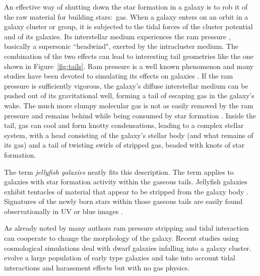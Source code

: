 An effective way of shutting down the star formation in a galaxy is to rob it of the raw material for building stars:~gas.
When a galaxy enters on an orbit in a galaxy cluster or group, it is subjected to the tidal forces of the cluster potential and of its galaxies.
Its interstellar medium experiences the ram pressure \citep{GunnGott1972}, basically a supersonic ``headwind", exerted by the intracluster medium.
The combination of the two effects can lead to interesting tail geometries like the one shown in Figure~\ref{fig:tails}.
Ram pressure is a well known phenomenon and many studies have been devoted to simulating its effects on galaxies \citep[e.g.:][]{Mori2000, Mayer2006, Roediger2008, Roediger2015, Steinhauser2016, Yun2018, Steyrleithner2020}.
If the ram pressure is sufficiently vigorous, the galaxy's diffuse interstellar medium can be pushed out of its gravitational well, forming a tail of escaping \Hi{} gas in the galaxy's wake.
The much more clumpy molecular gas is not as easily removed by the ram pressure and remains behind while being consumed by star formation \citep{Abramson2014, Lee2017, Wang2020}.
Inside the tail, gas can cool and form knotty condensations, leading to a complex stellar system, with a head consisting of the galaxy's stellar body (and what remains of its gas) and a tail of twisting swirls of stripped gas, beaded with knots of star formation.

The term \emph{jellyfish galaxies} \citep{Ebeling2013} neatly fits this description. %
The term applies to galaxies with star formation activity within the gaseous tails.
Jellyfish galaxies exhibit tentacles of material that appear to be stripped from the galaxy body \citep{Poggianti2017a, Poggianti2019b, Ramatsoku2020}.
Signatures of the newly born stars within those gaseous tails are easily found observationally in UV or blue images \citep{Cortese2007,Smith2010a}.
\bigskip

As already noted by many authors \citep{Mayer2001, Mayer2007, Mastropietro2005} %
ram pressure stripping \citep{GunnGott1972, Roediger2008, Roediger2015} and tidal interaction can cooperate to change the morphology of the galaxy.
Recent studies using cosmological simulations deal with dwarf galaxies infalling into a galaxy cluster.
\citet{Smith2015} evolve a large population of early type galaxies and take into account tidal interactions and harassment effects but with no gas physics.


